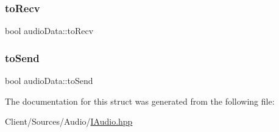 \mbox{\label{structaudioData_ab253b532ad74a4fe9c6937f4299662da}} 
\subsubsection{\texorpdfstring{to\+Recv}{toRecv}}
{\footnotesize\ttfamily bool audio\+Data\+::to\+Recv}

\mbox{\label{structaudioData_ae77d23a63dc014afa358ac3de5f25bde}} 
\subsubsection{\texorpdfstring{to\+Send}{toSend}}
{\footnotesize\ttfamily bool audio\+Data\+::to\+Send}



The documentation for this struct was generated from the following file\+:\begin{DoxyCompactItemize}
\item 
Client/\+Sources/\+Audio/\hyperlink{IAudio_8hpp}{I\+Audio.\+hpp}\end{DoxyCompactItemize}
